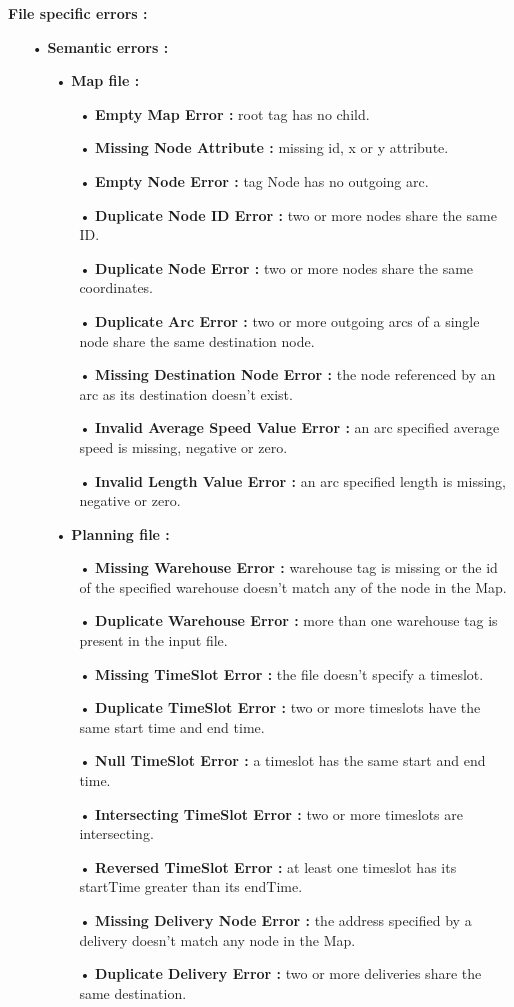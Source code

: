 \documentclass[paper=a4,fontsize=11pt]{report}
\numberwithin{equation}{section}		%
\numberwithin{figure}{section}		%
\numberwithin{table}{section}		%
\begin{document}
\textbf{File specific errors :}
\begin{itemize}
  \item[•] \textbf{Semantic errors :}
  \begin{itemize}
    \item[•] \textbf{Map file :}
    \begin{itemize}
      \item[•] \textbf{Empty Map Error :} root tag has no child.
      \item[•] \textbf{Missing Node Attribute :} missing id, x or y attribute.
      \item[•] \textbf{Empty Node Error :} tag Node has no outgoing arc.
      \item[•] \textbf{Duplicate Node ID Error :} two or more nodes share the same ID.
      \item[•] \textbf{Duplicate Node Error :} two or more nodes share the same coordinates.
      \item[•] \textbf{Duplicate Arc Error :} two or more outgoing arcs of a single node share the same destination node. 
      \item[•] \textbf{Missing Destination Node Error :} the node referenced by an arc as its destination doesn’t exist. 
      \item[•] \textbf{Invalid Average Speed Value Error :} an arc specified average speed is missing, negative or zero. 
      \item[•] \textbf{Invalid Length Value Error :} an arc specified length is missing, negative or zero.
    \end{itemize}

    \item[•] \textbf{Planning file :}
    \begin{itemize}
      \item[•] \textbf{Missing Warehouse Error :} warehouse tag is missing or the id of the specified warehouse doesn’t match any of the node in the Map.
      \item[•] \textbf{Duplicate Warehouse Error :} more than one warehouse tag is present in the input file.
      \item[•] \textbf{Missing TimeSlot Error :} the file doesn’t specify a timeslot.
      \item[•] \textbf{Duplicate TimeSlot Error :} two or more timeslots have the same start time and end time.
      \item[•] \textbf{Null TimeSlot Error :} a timeslot has the same start and end time.
      \item[•] \textbf{Intersecting TimeSlot Error :} two or more timeslots are intersecting.
      \item[•] \textbf{Reversed TimeSlot Error :} at least one timeslot has its startTime greater than its endTime.
      \item[•] \textbf{Missing Delivery Node Error :} the address specified by a delivery doesn’t match any node in the Map.
      \item[•] \textbf{Duplicate Delivery Error :} two or more deliveries share the same destination. 
    \end{itemize}
  \end{itemize}
\end{itemize}
\end{document}
